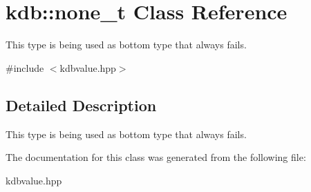 \hypertarget{classkdb_1_1none__t}{\section{kdb\-:\-:none\-\_\-t Class Reference}
\label{classkdb_1_1none__t}
}


This type is being used as bottom type that always fails.  




{\ttfamily \#include $<$kdbvalue.\-hpp$>$}



\subsection{Detailed Description}
This type is being used as bottom type that always fails. 

The documentation for this class was generated from the following file\-:\begin{DoxyCompactItemize}
\item 
kdbvalue.\-hpp\end{DoxyCompactItemize}
